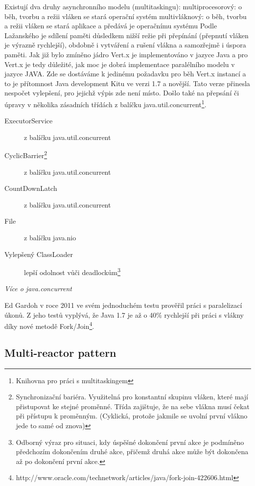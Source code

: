 Existují dva druhy asynchronního modelu (multitaskingu):
multiprocesorový: o běh, tvorbu a režii vláken se stará operační systém
multivláknový: o běh, tvorbu a režii vláken se stará aplikace a předává je operačnímu systému
Podle Lažanského\cite{vlaknaCvut} je sdílení paměti důsledkem nižší režie při přepínání (přepnutí vláken je výrazně rychlejší), obdobně i vytváření a rušení vlákna a samozřejmě i úspora paměti.
Jak již bylo zmíněno jádro Vert.x je implementováno v jazyce Java a pro Vert.x je tedy důležité, jak moc je dobrá implementace paralélního modelu v jazyce JAVA. Zde se dostáváme k jedinému požadavku pro běh Vert.x instancí a to je přítomnost Java development Kitu ve verzi 1.7 a novější. Tato verze přinesla nespočet vylepšení, pro jejichž výpis zde není místo. Došlo také na přepsání či úpravy v několika zásadních třídách z balíčku java.util.concurrent\footnote{Knihovna pro práci s multitaskingem}.
\begin{description}
\item[ExecutorService]{z balíčku java.util.concurrent}
\item[CyclicBarrier\footnote{Synchronizační bariéra. Využitelná pro konstantní skupinu vláken, které mají přistupovat ke stejné proměnné. Třída zajištuje, že na sebe vlákna musí čekat při přístupu k proměnným. (Cyklická, protože jakmile se uvolní první vlákno jede to samé od znova)}]{z balíčku java.util.concurrent}
\item[CountDownLatch]{z balíčku java.util.concurrent}
\item[File]{z balíčku java.nio}
\item[Vylepšený ClassLoader]{lepší odolnost vůči deadlockům\footnote{ Odborný výraz pro situaci, kdy úspěšné dokončení první akce je podmíněno předchozím dokončením druhé akce, přičemž druhá akce může být dokončena až po dokončení první akce.}}
\end{description}
\emph{Více o java.concurrent\cite{javaChangelog}}

Ed Gardoh v roce 2011 ve svém jednoduchém testu\cite{serialTest} prověřil práci s paralelizací úkonů. Z jeho testů vyplývá, že Java 1.7 je až o 40\% rychlejší při práci s vlákny díky nové metodě Fork/Join\footnote{http://www.oracle.com/technetwork/articles/java/fork-join-422606.html}.

\subsection{Multi-reactor pattern}

